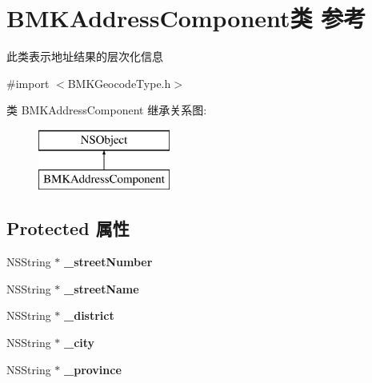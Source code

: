 \hypertarget{interface_b_m_k_address_component}{}\section{B\+M\+K\+Address\+Component类 参考}
\label{interface_b_m_k_address_component}


此类表示地址结果的层次化信息  




{\ttfamily \#import $<$B\+M\+K\+Geocode\+Type.\+h$>$}

类 B\+M\+K\+Address\+Component 继承关系图\+:\begin{figure}[H]
\begin{center}
\leavevmode
\includegraphics[height=2.000000cm]{interface_b_m_k_address_component}
\end{center}
\end{figure}
\subsection*{Protected 属性}
\begin{DoxyCompactItemize}
\item 
\hypertarget{interface_b_m_k_address_component_aa0266bba479e431954882b7ab5cbfa07}{}N\+S\+String $\ast$ {\bfseries \+\_\+street\+Number}\label{interface_b_m_k_address_component_aa0266bba479e431954882b7ab5cbfa07}

\item 
\hypertarget{interface_b_m_k_address_component_a8eb365c63cc3c5993b597658fc398181}{}N\+S\+String $\ast$ {\bfseries \+\_\+street\+Name}\label{interface_b_m_k_address_component_a8eb365c63cc3c5993b597658fc398181}

\item 
\hypertarget{interface_b_m_k_address_component_af95961f735ab9789f2be5e11a3ff6875}{}N\+S\+String $\ast$ {\bfseries \+\_\+district}\label{interface_b_m_k_address_component_af95961f735ab9789f2be5e11a3ff6875}

\item 
\hypertarget{interface_b_m_k_address_component_aedb7357a02424464616394fb9b051c56}{}N\+S\+String $\ast$ {\bfseries \+\_\+city}\label{interface_b_m_k_address_component_aedb7357a02424464616394fb9b051c56}

\item 
\hypertarget{interface_b_m_k_address_component_a233c3fae615c60ff44ce462fe7de7e30}{}N\+S\+String $\ast$ {\bfseries \+\_\+province}\label{interface_b_m_k_address_component_a233c3fae615c60ff44ce462fe7de7e30}

\end{DoxyCompactItemize}

